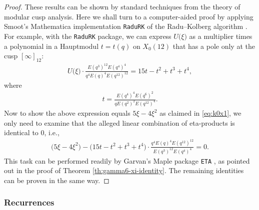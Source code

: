 \documentclass[12pt,reqno]{amsart}
\numberwithin{equation}{section}
\theoremstyle{theorem}
\theoremstyle{definition}
\begin{document}
\begin{proof}
	These results can be shown by standard techniques from the theory of modular cusp analysis. Here we shall turn to a computer-aided proof by applying Smoot's \textsf{Mathematica} implementation \texttt{RaduRK} \cite{Smo2021} of the Radu--Kolberg algorithm \cite{Rad2015}. For example, with the \texttt{RaduRK} package, we can express $U\big(\xi\big)$ as a multiplier times a polynomial in a Hauptmodul $t=t(q)$ on $X_0(12)$ that has a pole only at the cusp $[\infty]_{12}$:
	\begin{align*}
		U\big(\xi\big)\cdot \frac{E(q^3)^{12} E(q^4)^4}{q^4 E(q)^4 E(q^{12})^{12}} = 15 t - t^2 + t^3 + t^4,
	\end{align*}
	where
	\begin{align*}
		t = \frac{E(q^4)^4 E(q^6)^2}{q E(q^2)^2 E(q^{12})^4}.
	\end{align*}
	Now to show the above expression equals $5 \xi - 4 \xi^2$ as claimed in \eqref{eq:k0x1}, we only need to examine that the alleged linear combination of eta-products is identical to $0$, i.e.,
	\begin{align*}
		\big(5 \xi - 4 \xi^2\big)-\big(15 t - t^2 + t^3 + t^4\big) \cdot \frac{q^4 E(q)^4 E(q^{12})^{12}}{E(q^3)^{12} E(q^4)^4} = 0.
	\end{align*}
	This task can be performed readily by Garvan's \textsf{Maple} package \texttt{ETA} \cite{Gar1999}, as pointed out in the proof of Theorem \ref{th:gamma6-xi-identity}. The remaining identities can be proven in the same way.  
\end{proof}

\subsubsection{Recurrences}\label{sec:kappa-xi-rec}
\end{document}
